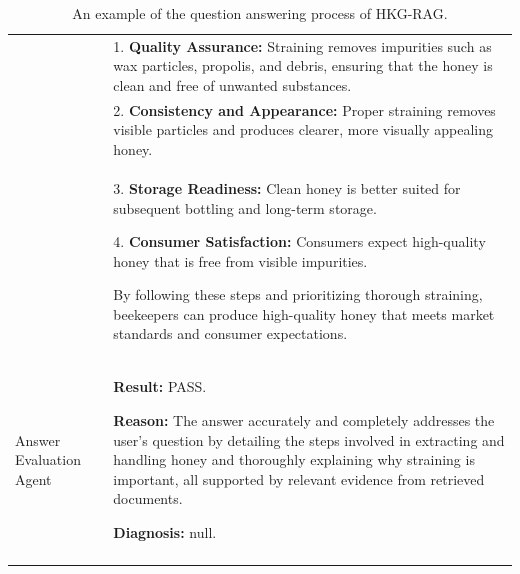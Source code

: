 \begin{longtable}{p{} p{}}
&
1. \textbf{Quality Assurance:} Straining removes impurities such as wax particles, propolis, and debris, ensuring that the honey is clean and free of unwanted substances.
\\

&
2. \textbf{Consistency and Appearance:} Proper straining removes visible particles and produces clearer, more visually appealing honey.
\\

&
3. \textbf{Storage Readiness:} Clean honey is better suited for subsequent bottling and long-term storage. \par
4. \textbf{Consumer Satisfaction:} Consumers expect high-quality honey that is free from visible impurities. \par
By following these steps and prioritizing thorough straining, beekeepers can produce high-quality honey that meets market standards and consumer expectations.
\\

Answer Evaluation Agent
&
\textbf{Result:} PASS. \par
\textbf{Reason:} The answer accurately and completely addresses the user's question by detailing the steps involved in extracting and handling honey and thoroughly explaining why straining is important, all supported by relevant evidence from retrieved documents. \par
\textbf{Diagnosis:} null.
\\

\bottomrule

\caption{An example of the question answering process of HKG-RAG.}
\label{tab:qa-example}

\end{longtable}